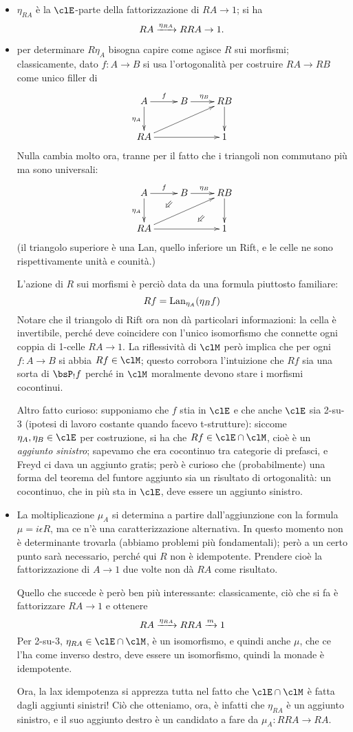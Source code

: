 \documentclass{amsart}
\begin{document}
\begin{itemize}
  \item $\eta_{RA}$ è la $\clE$-parte della fattorizzazione di $RA\to 1$; si ha 
  \[RA \xrightarrow{\eta_{RA}} RRA \to 1.\]
  \item per determinare $R\eta_A$ bisogna capire come agisce $R$ sui morfismi; classicamente, dato $f : A \to B$ si usa l'ortogonalità per costruire $RA \to RB$ come unico filler di 
  \[
  \xymatrix{
    A \ar[r]^f \ar[d]_{\eta_A} & B \ar[r]^{\eta_B} & RB \ar[d]\\
    RA \ar[rr] \ar[urr]&& 1
  }  
  \] 
  Nulla cambia molto ora, tranne per il fatto che i triangoli non commutano più ma sono universali:
  \[
  \xymatrix{
    A\ar@{}[drr]|(.3)\Swarrow\ar@{}[drr]|(.7)\Swarrow \ar[r]^f \ar[d]_{\eta_A} & B \ar[r]^{\eta_B} & RB \ar[d]\\
    RA \ar[rr] \ar[urr]&& 1
  }  
  \] 
  (il triangolo superiore è una Lan, quello inferiore un Rift, e le celle ne sono rispettivamente unità e counità.)

  L'azione di $R$ sui morfismi è perciò data da una formula piuttosto familiare:
  \[Rf = \mathrm{Lan}_{\eta_A}(\eta_B f)\]
  Notare che il triangolo di Rift ora non dà particolari informazioni: la cella è invertibile, perché deve coincidere con l'unico isomorfismo che connette ogni coppia di 1-celle $RA\to 1$. La riflessività di $\clM$ però implica che per ogni $f : A \to B$ si abbia $Rf \in\clM$; questo corrobora l'intuizione che $Rf$ sia una sorta di $\bsP_! f$ perché in $\clM$ moralmente devono stare i morfismi cocontinui. 
  
  Altro fatto curioso: supponiamo che $f$ stia in $\clE$ e che anche $\clE$ sia 2-su-3 (ipotesi di lavoro costante quando facevo t-strutture): siccome $\eta_A, \eta_B \in\clE$ per costruzione, si ha che $Rf \in\clE\cap\clM$, cioè è un \emph{aggiunto sinistro}; sapevamo che era cocontinuo tra categorie di prefasci, e Freyd ci dava un aggiunto gratis; però è curioso che (probabilmente) una forma del teorema del funtore aggiunto sia un risultato di ortogonalità: un cocontinuo, che in più sta in $\clE$, deve essere un aggiunto sinistro.
  \item La moltiplicazione $\mu_A$ si determina a partire dall'aggiunzione con la formula $\mu = i\epsilon R$, ma ce n'è una caratterizzazione alternativa. In questo momento non è determinante trovarla (abbiamo problemi più fondamentali); però a un certo punto sarà necessario, perché qui $R$ non è idempotente. Prendere cioè la fattorizzazione di $A\to 1$ due volte non dà $RA$ come risultato.

  Quello che succede è però ben più interessante: classicamente, ciò che si fa è fattorizzare $RA\to 1$ e ottenere
  \[RA \xrightarrow{\eta_{RA}} RRA \xrightarrow{m} 1 \]
  Per 2-su-3, $\eta_{RA}\in\clE\cap\clM$, è un isomorfismo, e quindi anche $\mu$, che ce l'ha come inverso destro, deve essere un isomorfismo, quindi la monade è idempotente.

  Ora, la lax idempotenza si apprezza tutta nel fatto che $\clE\cap \clM$ è fatta dagli aggiunti sinistri! Ciò che otteniamo, ora, è infatti che $\eta_{RA}$ è un aggiunto sinistro, e il suo aggiunto destro è un candidato a fare da $\mu_A : RRA \to RA$.
\end{itemize}
\end{document}
